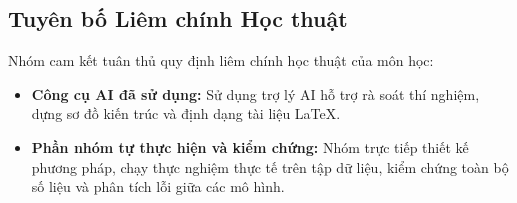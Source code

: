 \documentclass[a4paper,12pt]{article}
\begin{document}
\subsection{Tuyên bố Liêm chính Học thuật}
Nhóm cam kết tuân thủ quy định liêm chính học thuật của môn học:
\begin{itemize}
    \item \textbf{Công cụ AI đã sử dụng:} Sử dụng trợ lý AI hỗ trợ rà soát thí nghiệm, dựng sơ đồ kiến trúc và định dạng tài liệu LaTeX.
    \item \textbf{Phần nhóm tự thực hiện và kiểm chứng:} Nhóm trực tiếp thiết kế phương pháp, chạy thực nghiệm thực tế trên tập dữ liệu, kiểm chứng toàn bộ số liệu và phân tích lỗi giữa các mô hình.
\end{itemize}
\end{document}
